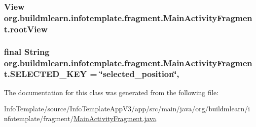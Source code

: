 \subsubsection[{\texorpdfstring{root\+View}{rootView}}]{\setlength{\rightskip}{0pt plus 5cm}View org.\+buildmlearn.\+infotemplate.\+fragment.\+Main\+Activity\+Fragment.\+root\+View\hspace{0.3cm}{\ttfamily [private]}}\hypertarget{classorg_1_1buildmlearn_1_1infotemplate_1_1fragment_1_1MainActivityFragment_a230066c6f9d010227ce26cacb8b0a59f}{}\label{classorg_1_1buildmlearn_1_1infotemplate_1_1fragment_1_1MainActivityFragment_a230066c6f9d010227ce26cacb8b0a59f}
\subsubsection[{\texorpdfstring{S\+E\+L\+E\+C\+T\+E\+D\+\_\+\+K\+EY}{SELECTED_KEY}}]{\setlength{\rightskip}{0pt plus 5cm}final String org.\+buildmlearn.\+infotemplate.\+fragment.\+Main\+Activity\+Fragment.\+S\+E\+L\+E\+C\+T\+E\+D\+\_\+\+K\+EY = \char`\"{}selected\+\_\+position\char`\"{}\hspace{0.3cm}{\ttfamily [static]}, {\ttfamily [private]}}\hypertarget{classorg_1_1buildmlearn_1_1infotemplate_1_1fragment_1_1MainActivityFragment_a81992e899ba7416b7f53eddd2191e778}{}\label{classorg_1_1buildmlearn_1_1infotemplate_1_1fragment_1_1MainActivityFragment_a81992e899ba7416b7f53eddd2191e778}


The documentation for this class was generated from the following file\+:\begin{DoxyCompactItemize}
\item 
Info\+Template/source/\+Info\+Template\+App\+V3/app/src/main/java/org/buildmlearn/infotemplate/fragment/\hyperlink{InfoTemplate_2source_2InfoTemplateAppV3_2app_2src_2main_2java_2org_2buildmlearn_2infotemplate_2fcc5a6e7e0c3e52d3892aebb1b333ffde}{Main\+Activity\+Fragment.\+java}\end{DoxyCompactItemize}
